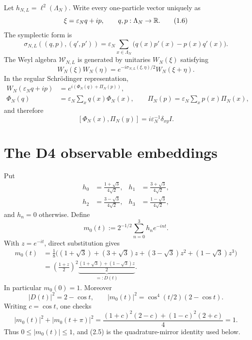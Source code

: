 \documentclass[11pt,a4paper]{article}
\newcommand{\eps}{\varepsilon}
\newcommand{\W}{\mathcal W}
\begin{document}

Let \(h_{N,L}=\ell^2(\Lambda_N)\).  Write every one-particle vector uniquely as
\[
 \xi=\eps_Nq+ip,\qquad q,p:\Lambda_N\to\R.                     \tag{1.6}
\]
The symplectic form is
\[
 \sigma_{N,L}((q,p),(q',p'))
 =\eps_N\sum_{x\in\Lambda_N}\bigl(q(x)p'(x)-p(x)q'(x)\bigr).    \tag{1.7}
\]
The Weyl algebra \(\W_{N,L}\) is generated by unitaries \(W_N(\xi)\) satisfying
\[
 W_N(\xi)W_N(\eta)=e^{-i\sigma_{N,L}(\xi,\eta)/2}W_N(\xi+\eta). \tag{1.8}
\]
In the regular Schrödinger representation,
\begin{align}
 W_N(\eps_Nq+ip)&=e^{i(\Phi_N(q)+\Pi_N(p))},\\
 \Phi_N(q)&=\eps_N\sum_xq(x)\Phi_N(x),\qquad
 \Pi_N(p)=\eps_N\sum_xp(x)\Pi_N(x),                            \tag{1.9}
\end{align}
and therefore
\[
 [\Phi_N(x),\Pi_N(y)]=i\eps_N^{-1}\delta_{xy}I.                \tag{1.10}
\]

\section{The D4 observable embeddings}


Put
\begin{align}
 h_0&=\frac{1+\sqrt3}{4\sqrt2},&
 h_1&=\frac{3+\sqrt3}{4\sqrt2},\\
 h_2&=\frac{3-\sqrt3}{4\sqrt2},&
 h_3&=\frac{1-\sqrt3}{4\sqrt2},                               \tag{2.1}
\end{align}
and \(h_n=0\) otherwise.  Define
\[
 m_0(t):=2^{-1/2}\sum_{n=0}^3h_ne^{-int}.                       \tag{2.2}
\]
With \(z=e^{-it}\), direct substitution gives
\begin{align}
 m_0(t)
 &=\frac18\bigl((1+\sqrt3)+(3+\sqrt3)z+(3-\sqrt3)z^2
                 +(1-\sqrt3)z^3\bigr)\\
 &=\left(\frac{1+z}{2}\right)^2
   \underbrace{\frac{(1+\sqrt3)+(1-\sqrt3)z}{2}}_{=:D(t)}.     \tag{2.3}
\end{align}
In particular \(m_0(0)=1\).  Moreover
\[
 |D(t)|^2=2-\cos t,\qquad
 |m_0(t)|^2=\cos^4(t/2)(2-\cos t).                              \tag{2.4}
\]
Writing \(c=\cos t\), one checks
\[
 |m_0(t)|^2+|m_0(t+\pi)|^2
 =\frac{(1+c)^2(2-c)+(1-c)^2(2+c)}4=1.                          \tag{2.5}
\]
Thus \(0\le |m_0(t)|\le1\), and (2.5) is the quadrature-mirror
identity used below.
\end{document}

